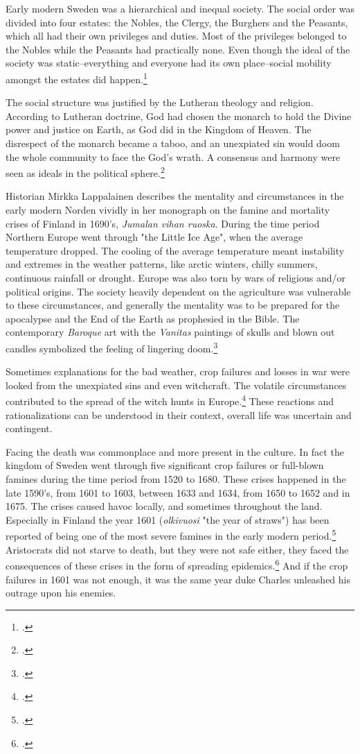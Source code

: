 Early modern Sweden was a hierarchical and inequal society. The social order was divided into four estates: the Nobles, the Clergy, the Burghers and the Peasants, which all had their own privileges and duties. Most of the privileges belonged to the Nobles while the Peasants had practically none. Even though the ideal of the society was static–everything and everyone had its own place–social mobility amongst the estates did happen.\footcites[pp. 21-23,]{hopesAndFearsIntro}[pp. 21-22.]{agencyAndStateBuilding} 

The social structure was justified by the Lutheran theology and religion. According to Lutheran doctrine, God had chosen the monarch to hold the Divine power and justice on Earth, as God did in the Kingdom of Heaven. The disrespect of the monarch became a taboo, and an unexpiated sin would doom the whole community to face the God's wrath. A consensus and harmony were seen as ideals in the political sphere.\footcites[pp. 24-28,]{hopesAndFearsIntro}[pp. 161-163.]{pSuurvalta}

Historian Mirkka Lappalainen describes the mentality and circumstances in the early modern Norden vividly in her monograph on the famine and mortality crises of Finland in 1690's, \textit{Jumalan vihan ruoska}. During the time period Northern Europe went through "the Little Ice Age", when the average temperature dropped. The cooling of the average temperature meant instability and extremes in the weather patterns, like arctic winters, chilly summers, continuous rainfall or drought. Europe was also torn by wars of religious and/or political origins. The society heavily dependent on the agriculture was vulnerable to these circumstances, and generally the mentality was to be prepared for the apocalypse and the End of the Earth as prophesied in the Bible. The contemporary \textit{Baroque} art with the \textit{Vanitas} paintings of skulls and blown out candles symbolized the feeling of lingering doom.\footcite[pp. 23-25.]{lappalainen12} 

Sometimes explanations for the bad weather, crop failures and losses in war were looked from the unexpiated sins and even witchcraft. The volatile circumstances contributed to the spread of the witch hunts in Europe.\footcite[pp. 23-29]{lappalainen12} These reactions and rationalizations can be understood in their context, overall life was uncertain and contingent. 

Facing the death was commonplace and more present in the culture. In fact the kingdom of Sweden went through five significant crop failures or full-blown famines during the time period from 1520 to 1680. These crises happened in the late 1590's, from 1601 to 1603, between 1633 and 1634, from 1650 to 1652 and in 1675. The crises caused havoc locally, and sometimes throughout the land. Especially in Finland the year 1601 (\textit{olkivuosi} "the year of straws") has been reported of being one of the most severe famines in the early modern period.\footcite[pp. 9-11.]{dribeEtAll} Aristocrats did not starve to death, but they were not safe either, they faced the consequences of these crises in the form of spreading epidemics.\footcite[p. 159.]{lappalainen06} And if the crop failures in 1601 was not enough, it was the same year duke Charles unleashed his outrage upon his enemies.

